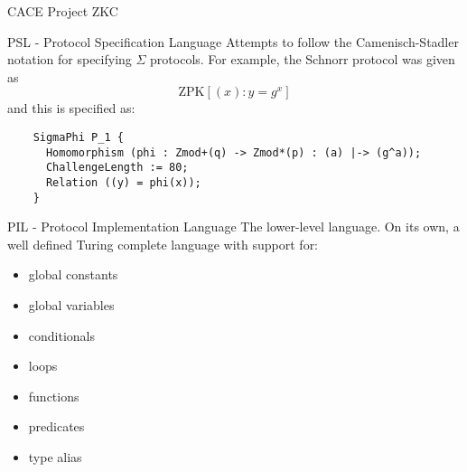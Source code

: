 \documentclass{beamer}
\begin{document}
\begin{frame}{CACE Project ZKC}
  \begin{center}
  \end{center}
\end{frame}

\begin{frame}[fragile]{PSL - Protocol Specification Language}
  Attempts to follow the Camenisch-Stadler notation for specifying
  $\Sigma$ protocols. For example, the Schnorr protocol was given as
  \[
  \textrm{ZPK}\left[ (x): y = g^x \right]
  \]
  and this is specified as:
  \begin{lstlisting}
    SigmaPhi P_1 {
      Homomorphism (phi : Zmod+(q) -> Zmod*(p) : (a) |-> (g^a));
      ChallengeLength := 80;
      Relation ((y) = phi(x));
    }
  \end{lstlisting}
\end{frame}

\begin{frame}{PIL - Protocol Implementation Language}
  The lower-level language. On its own, a well defined Turing complete
  language with support for:
  \begin{itemize}
  \item global constants
  \item global variables
  \item conditionals
  \item loops
  \item functions
  \item predicates
  \item type alias
  \end{itemize}
\end{frame}
\end{document}
